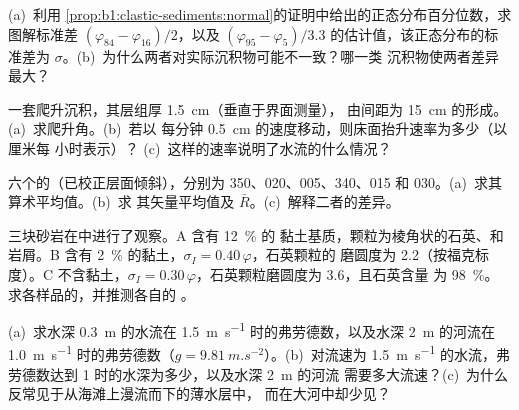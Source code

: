 \begin{exercise}[$\star\star$]\label{exo:b1:clastic-sediments:5}
(a)~利用
\cref{prop:b1:clastic-sediments:normal}的证明中给出的正态分布百分位数，求图解标准差
$(\varphi_{84} - \varphi_{16})/2$，以及
$(\varphi_{95} - \varphi_5)/3.3$ 的估计值，该正态分布的标准差为
$\sigma$。(b)~为什么两者对实际沉积物可能不一致？哪一类
沉积物使两者差异最大？
\end{exercise}

\begin{exercise}[$\star\star$]\label{exo:b1:clastic-sediments:6}
一套爬升沉积，其层组厚 \qty{1.5}{cm}（垂直于界面测量），
由间距为 \qty{15}{cm} 的形成。(a)~求爬升角。(b)~若以
每分钟 \qty{0.5}{cm} 的速度移动，则床面抬升速率为多少（以厘米每
小时表示）？
(c)~这样的速率说明了水流的什么情况？
\end{exercise}

\begin{exercise}[$\star\star$]\label{exo:b1:clastic-sediments:7}
六个的（已校正层面倾斜），分别为
350、020、005、340、015 和 030。(a)~求其算术平均值。(b)~求
其矢量平均值及 $\bar R$。(c)~解释二者的差异。
\end{exercise}

\begin{exercise}[$\star\star$]\label{exo:b1:clastic-sediments:8}
三块砂岩在中进行了观察。A 含有 \qty{12}{\percent} 的
黏土基质，颗粒为棱角状的石英、和岩屑。B 含有
\qty{2}{\percent} 的黏土，$\sigma_I = 0.40\,\varphi$，石英颗粒的
磨圆度为 \num{2.2}（按福克标度）。C 不含黏土，$\sigma_I =
0.30\,\varphi$，石英颗粒磨圆度为 \num{3.6}，且石英含量
为 \qty{98}{\percent}。求各样品的，并推测各自的
。
\end{exercise}

\begin{exercise}[$\star\star$]\label{exo:b1:clastic-sediments:9}
(a)~求水深 \qty{0.3}{m} 的水流在
\qty{1.5}{m.s^{-1}} 时的弗劳德数，以及水深 \qty{2}{m} 的河流在 \qty{1.0}{m.s^{-1}} 时的弗劳德数（$g
= \qty{9.81}{m.s^{-2}}$）。(b)~对流速为
\qty{1.5}{m.s^{-1}} 的水流，弗劳德数达到 1 时的水深为多少，以及水深 \qty{2}{m} 的河流
需要多大流速？(c)~为什么反常见于从海滩上漫流而下的薄水层中，
而在大河中却少见？
\end{exercise}

